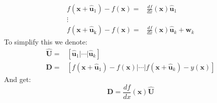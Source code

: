 \begin{align*}
	f\left(\mathbf{x}+\hat{\mathbf{u}}_{1}\right)-f\left(\mathbf{x}\right)= & \frac{df}{dx}\left(\mathbf{x}\right)\hat{\mathbf{u}}_{1}\\
	\vdots\\
	f\left(\mathbf{x}+\hat{\mathbf{u}}_{\text{k}}\right)-f\left(\mathbf{x}\right)= & \frac{df}{dx}\left(\mathbf{x}\right)\hat{\mathbf{u}}_{k}+\mathbf{w}_{k}
\end{align*}
To simplify this we denote:
\begin{align*}
	\hat{\mathbf{U}}= & \left[\hat{\mathbf{u}}_{1}|\cdots|\hat{\mathbf{u}}_{k}\right]\\
	\mathbf{D}= & \left[f\left(\mathbf{x}+\hat{\mathbf{u}}_{1}\right)-f\left(\mathbf{x}\right)|\cdots|f\left(\mathbf{x}+\hat{\mathbf{u}}_{k}\right)-y\left(\mathbf{x}\right)\right]
\end{align*}
And get:
\[
\mathbf{D}=\frac{df}{dx}\left(\mathbf{x}\right)\hat{\mathbf{U}}
\]

